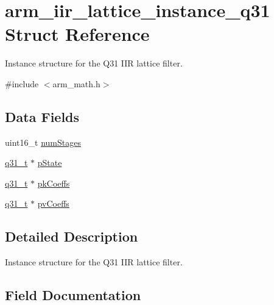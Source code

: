 \hypertarget{structarm__iir__lattice__instance__q31}{}\section{arm\+\_\+iir\+\_\+lattice\+\_\+instance\+\_\+q31 Struct Reference}
\label{structarm__iir__lattice__instance__q31}


Instance structure for the Q31 I\+IR lattice filter.  




{\ttfamily \#include $<$arm\+\_\+math.\+h$>$}

\subsection*{Data Fields}
\begin{DoxyCompactItemize}
\item 
uint16\+\_\+t \mbox{\hyperlink{structarm__iir__lattice__instance__q31_a4cceb90547b3e585d4c7aabaa8057212}{num\+Stages}}
\item 
\mbox{\hyperlink{arm__math_8h_adc89a3547f5324b7b3b95adec3806bc0}{q31\+\_\+t}} $\ast$ \mbox{\hyperlink{structarm__iir__lattice__instance__q31_adee4ba3ee8869865af7d8fa08ca913d6}{p\+State}}
\item 
\mbox{\hyperlink{arm__math_8h_adc89a3547f5324b7b3b95adec3806bc0}{q31\+\_\+t}} $\ast$ \mbox{\hyperlink{structarm__iir__lattice__instance__q31_a9d45339bf841bf86aec57be5f70d2b01}{pk\+Coeffs}}
\item 
\mbox{\hyperlink{arm__math_8h_adc89a3547f5324b7b3b95adec3806bc0}{q31\+\_\+t}} $\ast$ \mbox{\hyperlink{structarm__iir__lattice__instance__q31_a3d7de56fe9de3458f033a64f14407533}{pv\+Coeffs}}
\end{DoxyCompactItemize}


\subsection{Detailed Description}
Instance structure for the Q31 I\+IR lattice filter. 

\subsection{Field Documentation}
\mbox{\label{structarm__iir__lattice__instance__q31_a4cceb90547b3e585d4c7aabaa8057212}} 
